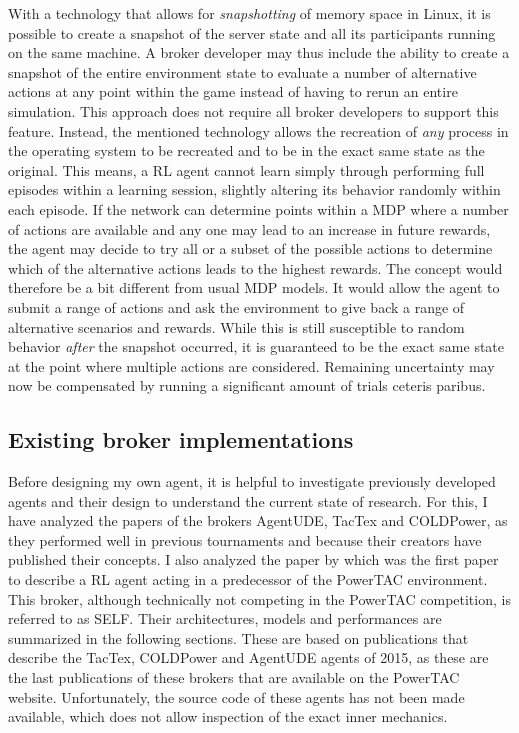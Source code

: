 With a technology that allows for \emph{snapshotting} of memory space in Linux, it is possible to create a snapshot of
the server state and all its participants running on the same machine. A broker developer may thus include the
ability to create a snapshot of the entire environment state to evaluate a number of alternative actions at any point
within the game instead of having to rerun an entire simulation. This approach does not require all broker developers to
support this feature. Instead, the mentioned technology allows the recreation of \emph{any} process in the operating
system to be recreated and to be in the exact same state as the original. This means, a \ac{RL} agent cannot learn simply
through performing full episodes within a learning session, slightly altering its behavior randomly within each episode.
If the network can determine points within a \ac{MDP} where a number of actions are available and any one may lead to an
increase in future rewards, the agent may decide to try all or a subset of the possible actions to determine which of
the alternative actions leads to the highest rewards. The concept would therefore be a bit different from usual \ac{MDP}
models. It would allow the agent to submit a range of actions and ask the environment to give back a range of
alternative scenarios and rewards. While this is still susceptible to random behavior \emph{after} the snapshot occurred,
it is guaranteed to be the exact same state at the point where multiple actions are considered. Remaining uncertainty
may now be compensated by running a significant amount of trials ceteris paribus.




\subsection{Existing broker implementations}%
\label{sub:existing_broker_concepts}
Before designing my own agent, it is helpful to investigate previously developed agents and their design to understand
the current state of research. For this, I have analyzed the papers of the brokers AgentUDE, TacTex and COLDPower, as they
performed well in previous tournaments and because their creators have published their concepts. I also analyzed the
paper by \citet{peters2013reinforcement} which was the first paper to describe a \ac{RL} agent acting in a predecessor
of the  \ac{PowerTAC} environment. This broker, although technically not competing in the \ac{PowerTAC} competition, is
referred to as \ac{SELF}. Their architectures,
models and performances are summarized in the following sections. These are based on publications that describe the
TacTex, COLDPower and AgentUDE agents of 2015, as these are the last publications of these brokers that are available on
the \ac {PowerTAC} website. Unfortunately, the source code of these agents has not been made available, which does not
allow inspection of the exact inner mechanics.

